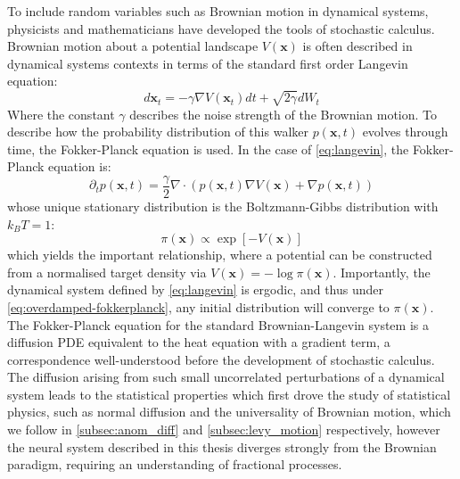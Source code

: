 To include random variables such as Brownian motion in dynamical systems, physicists and mathematicians have developed the tools of stochastic calculus. Brownian motion about a potential landscape $V(\textbf{x})$ is often described in dynamical systems contexts in terms of the standard first order Langevin equation:
\begin{equation}\label{eq:langevin}
    d\textbf{x}_t = -\gamma \nabla V(\textbf{x}_t) dt + \sqrt{2 \gamma} dW_t 
\end{equation}
Where the constant $\gamma$ describes the noise strength of the Brownian motion. To describe how the probability distribution of this walker $p(\textbf{x},t)$ evolves through time, the Fokker-Planck equation is used. In the case of \cref{eq:langevin}, the Fokker-Planck equation is:
\begin{equation}\label{eq:overdamped-fokkerplanck}
    \partial_t p(\textbf{x},t) = \frac{\gamma}{2} \nabla \cdot \left( p(\textbf{x},t) \nabla V(\textbf{x}) + \nabla p(\textbf{x},t) \right)
\end{equation}
whose unique stationary distribution is the Boltzmann-Gibbs distribution with $k_B T = 1$:
\begin{equation}\label{eq:boltzmann-gibbs}
    \pi(\textbf{x}) \propto \exp[-V(\textbf{x})]
\end{equation}
which yields the important relationship, where a potential can be constructed from a normalised target density via $V(\textbf{x}) = -\log \pi(\textbf{x})$. Importantly, the dynamical system defined by \cref{eq:langevin} is ergodic, and thus under \cref{eq:overdamped-fokkerplanck}, any initial distribution will converge to $\pi(\textbf{x})$. The Fokker-Planck equation for the standard Brownian-Langevin system is a diffusion PDE equivalent to the heat equation with a gradient term, a correspondence well-understood before the development of stochastic calculus. The diffusion arising from such small uncorrelated perturbations of a dynamical system leads to the statistical properties which first drove the study of statistical physics, such as normal diffusion and the universality of Brownian motion, which we follow in \cref{subsec:anom_diff} and \cref{subsec:levy_motion} respectively, however the neural system described in this thesis diverges strongly from the Brownian paradigm, requiring an understanding of fractional processes.


